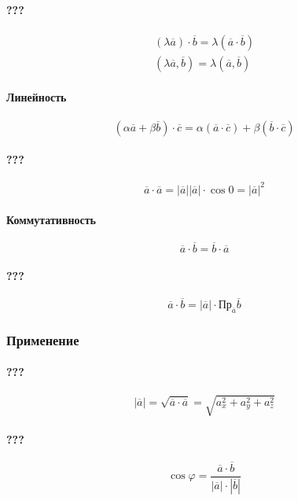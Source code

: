 \documentclass{article}
\begin{document}
\paragraph{???}
\begin{gather*}
    (\lambda \overline{a}) \cdot \overline{b} = \lambda(\overline{a} \cdot \overline{b}) \\
    (\lambda \overline{a}, \overline{b}) = \lambda(\overline{a}, \overline{b})
\end{gather*}


\paragraph{Линейность}
\[
    (\alpha \overline{a} + \beta \overline{b}) \cdot \overline{c} =
    \alpha (\overline{a} \cdot \overline{c}) + \beta (\overline{b} \cdot \overline{c})
\]

\paragraph{???}
\[
    \overline{a} \cdot \overline{a} = |\overline{a}||\overline{a}| \cdot \cos 0 = |\overline{a}|^2
\]

\paragraph{Коммутативность}
\[
    \overline{a} \cdot \overline{b} = \overline{b} \cdot \overline{a}
\]

\paragraph{???}
\[
    \overline{a} \cdot \overline{b} = |\overline{a}| \cdot \text{Пр}_{\overline{a}} \overline{b}
\]


\subsubsection{Применение}

\paragraph{???}
\[
    |\overline{a}| = \sqrt{\overline{a} \cdot \overline{a}} = \sqrt{a_x^2 + a_y^2 + a_z^2}
\]

\paragraph{???}
\[
    \cos \varphi = \frac{\overline{a} \cdot \overline{b}}{|\overline{a}| \cdot |\overline{b}|}
\]
\end{document}
